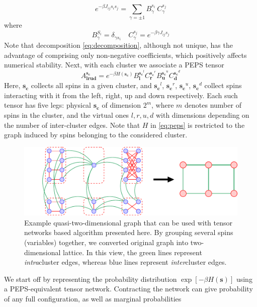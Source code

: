 \begin{equation}
    e^{-\beta J_{ij}s_i s_j} = \sum_{\gamma = \pm 1} B^{s_{i\phantom{j}}}_\gamma C^{s_j}_\gamma
\end{equation}
where 
\begin{equation}
\label{eq:decomposition}
    B^{S_i}_\gamma = \delta_{\gamma s_i} \quad C^{s_j}_\gamma = e^{-\beta \gamma J_{ij} s_j}
\end{equation}
Note that decomposition \eqref{eq:decomposition}, although not unique, has the advantage of comprising only non-negative coefficients, which positively affects numerical stability.
Next, with each cluster we associate a PEPS tensor
\begin{equation}
\label{eq:peps}
A^{\mathbf{s_c}}_{\mathbf{lrud}} = e^{-\beta H(\mathbf{s_c})} B^{\mathbf{s_c}^l}_\mathbf{l}C^{\mathbf{s_c}^r}_\mathbf{r}B^{\mathbf{s_c}^u}_\mathbf{u}C^{\mathbf{s_c}^d}_\mathbf{d}
\end{equation}
Here, $\mathbf{s_c}$ collects all spins in a given cluster, and $\mathbf{s_c}^l$, $\mathbf{s_c}^r$, $\mathbf{s_c}^u$, $\mathbf{s_c}^d$ collect spins interacting with it from the left, right, up and down respectively. Each such tensor has five legs: physical $\mathbf{s_c}$ of dimension $2^m$, where $m$ denotes number of spins in the cluster, and the virtual ones $l, r, u, d$ with dimensions depending on the number of inter-cluster edges. Note that $H$ in \eqref{eq:peps} is restricted to the graph induced by spins belonging to the considered cluster.

\begin{figure}
    \centering
    \includegraphics[width=\textwidth]{figures/clustering.pdf}
    \caption{Example quasi-two-dimensional graph that can be used with tensor networks based algorithm presented here. By grouping several spins (variables) together, we converted original graph into two-dimensional lattice. In this view, the green lines represent \emph{intra}cluster edges, whereas blue lines represent \emph{inter}cluster edges.}
    \label{fig:quasi2d}
\end{figure}
We start off by representing the probability distribution $\exp[-\beta H(\mathbf{s})]$ using a PEPS-equivalent tensor network.
Contracting the network can give probability of any full configuration, as well as marginal probabilities

